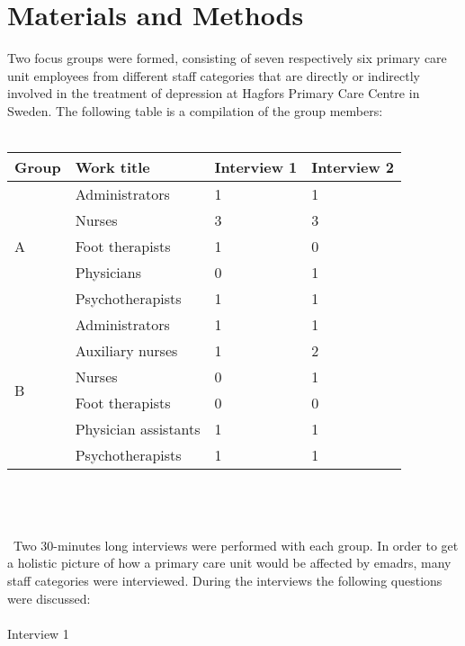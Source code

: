 \documentclass[12pt,a4paper,oneside]{article}
\let\oldcite\cite
\renewcommand*\cite[1]{\textsuperscript{\oldcite{#1}}}
\begin{document}
\section*{Materials and Methods}
Two focus groups were formed, consisting of seven respectively six primary care unit employees from different staff categories that are directly or indirectly involved in the treatment of depression at Hagfors Primary Care Centre in Sweden. The following table is a compilation of the group members:\\\\
\begin{tabular}{p{2em}|p{10em}|l|l}
Group & Work title & Interview 1 & Interview 2 \\
\hline
\multirow{ 5}{*}{A} & Administrators & 1 & 1 \\
& Nurses & 3 & 3 \\
& Foot therapists & 1 & 0\\
& Physicians & 0 & 1\\
& Psychotherapists & 1 & 1\\
\hline
\multirow{ 6}{*}{B} & Administrators & 1 & 1 \\
& Auxiliary nurses & 1 & 2 \\
& Nurses & 0 & 1 \\
& Foot therapists & 0 & 0\\
& Physician assistants & 1 & 1\\
& Psychotherapists & 1 & 1\\
\hline
\end{tabular}\\ \\\ \\\ 
Two 30-minutes long interviews were performed with each group. In order to get a holistic picture of how a primary care unit would be affected by e{\sc madrs}, many staff categories were interviewed\cite{goal1}. During the interviews the following questions were discussed:\\\ \\
Interview 1
\end{document}
